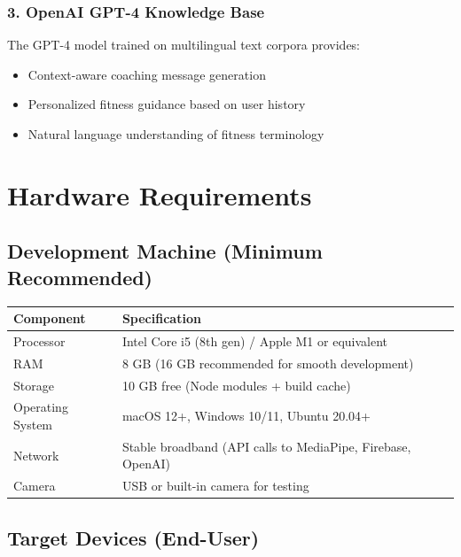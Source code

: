 \documentclass[12pt,a4paper]{article}
\begin{document}
\subsubsection*{3. OpenAI GPT-4 Knowledge Base}

The GPT-4 model trained on multilingual text corpora provides:

\begin{itemize}[noitemsep, topsep=2pt]
  \item Context-aware coaching message generation
  \item Personalized fitness guidance based on user history
  \item Natural language understanding of fitness terminology
\end{itemize}

\section{Hardware Requirements}

\subsection{Development Machine (Minimum Recommended)}

\begin{longtable}{p{4.5cm} p{8cm}}
\toprule
\textbf{Component} & \textbf{Specification} \\
\midrule
\endhead
Processor & Intel Core i5 (8th gen) / Apple M1 or equivalent \\
RAM & 8 GB (16 GB recommended for smooth development) \\
Storage & 10 GB free (Node modules + build cache) \\
Operating System & macOS 12+, Windows 10/11, Ubuntu 20.04+ \\
Network & Stable broadband (API calls to MediaPipe, Firebase, OpenAI) \\
Camera & USB or built-in camera for testing \\
\bottomrule
\end{longtable}

\subsection{Target Devices (End-User)}
\end{document}
